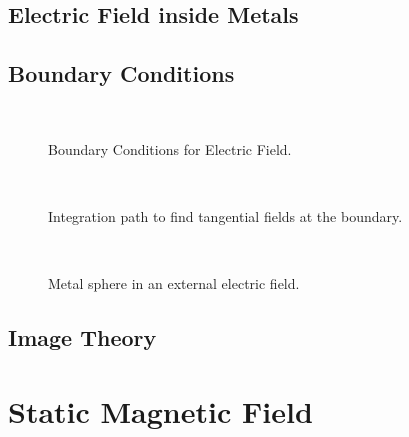 \subsection{Electric Field inside Metals}


\subsection{Boundary Conditions}



\begin{figure}[htbp]
\begin{center}
\strut{} \\
\end{center}
\caption{Boundary Conditions for Electric Field.}
\label{wind}
\end{figure}




\begin{figure}[htbp]
\begin{center}
\strut{} \\
\end{center}
\caption{Integration path to find tangential fields at the boundary.}
\label{wind}
\end{figure}





\begin{figure}[htbp]
\begin{center}
\strut{} \\
\end{center}
\caption{Metal sphere in an external electric field.}
\label{wind}
\end{figure}




\subsection{Image Theory}













\section{Static Magnetic Field}

